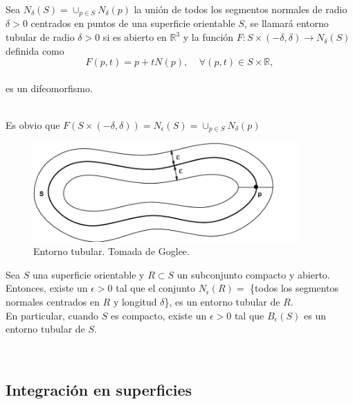\begin{definicion}
	Sea $N_{\delta}(S) = \cup_{p \in S} N_{\delta}(p)$ la unión de todos los segmentos normales de radio $\delta > 0$ centrados en puntos de una superficie orientable $S$, se llamará entorno tubular de radio $\delta > 0$ si es abierto en $\mathbb{R}^3$ y la función $F : S \times (-\delta, \delta) \to N_{\delta}(S)$ definida como
	${ }$\\
	$$ F(p,t) = p +tN(p), \;\;\;\; \forall (p,t) \in S \times \mathbb{R}, $$
	${ }$\\
	es un difeomorfismo.
\end{definicion}
${ }$\\

Es obvio que $F(S \times (-\delta, \delta)) = N_{\epsilon}(S) = \cup_{p \in S} N_{\delta}(p)$
${ }$\\

\begin{figure}[h]
	\begin{center}
		\includegraphics[width=0.9\textwidth]{imagenes/tubular.png}
	\end{center}
	\caption{Entorno tubular. Tomada de Goglee. }
	\label{fig:etiq_13}
\end{figure}

\begin{teorema}
	Sea $S$ una superficie orientable y $R \subset S$ un subconjunto compacto y abierto. Entonces, existe un $\epsilon > 0$ tal que el conjunto $N_{\epsilon}(R) =$ \{todos los segmentos normales centrados en $R$ y longitud $\delta$\}, es un entorno tubular de $R$.
	${ }$\\
	
	En particular, cuando $S$ es compacto, existe un $\epsilon > 0$ tal que $B_{\epsilon}(S)$ es un entorno tubular de $S$.
\end{teorema}




${ }$\\
\subsection{Integración en superficies}
${ }$\\

